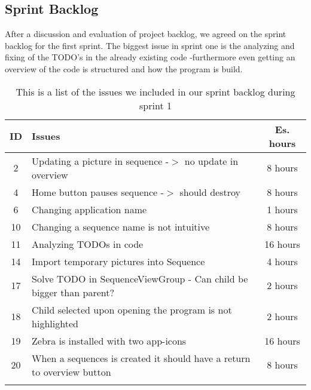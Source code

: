 \subsection{Sprint Backlog}\label{subsec:spr1_sprblog}
After a discussion and evaluation of project backlog, we agreed on the sprint backlog for the first sprint. The biggest issue in sprint one is the analyzing and fixing of the TODO's in the already existing code -furthermore even getting an overview of the code is structured and how the program is build.
\begin{longtable} { | c | p{12cm} | c | } 
\hline
	ID 	&	Issues	&		 Es. hours \\\hline
	2	& 	Updating a picture in sequence -$>$ no update in overview	&	8 hours	\\\hline
	4	& 	Home button pauses sequence -$>$ should destroy	&	8 hours	\\\hline
	6	& 	Changing application name	&	1 hours	\\\hline
	10	& 	Changing a sequence name is not intuitive	&	8 hours	\\\hline
	11	& 	Analyzing TODOs in code	&	16 hours	\\\hline
	14	& 	Import temporary pictures into Sequence	&	4 hours	\\\hline
	17	& 	Solve TODO in SequenceViewGroup - Can child be bigger than parent?	&	2 hours	\\\hline
	18	& 	Child selected upon opening the program is not highlighted	&	2 hours	\\\hline
	19	& 	Zebra is installed with two app-icons	&	16 hours	\\\hline
	20	& 	When a sequences is created it should have a return to overview button	&	8 hours	\\\hline
\caption{This is a list of the issues we included in our sprint backlog during sprint 1}
\label{tab:spr1_prodblog}
\end{longtable}
